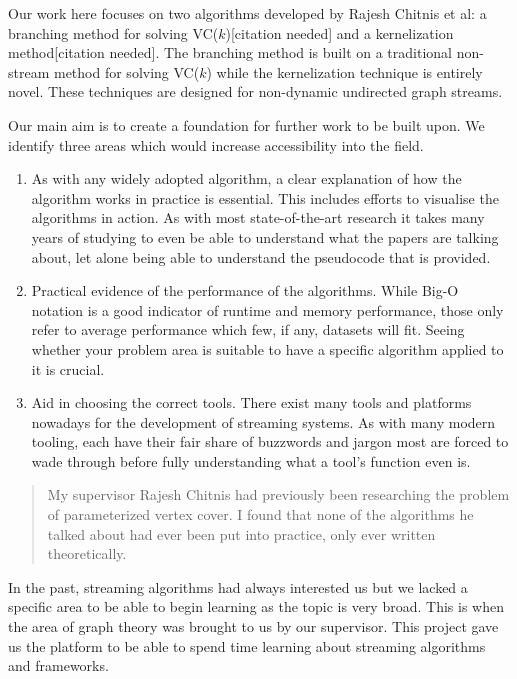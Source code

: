 Our work here focuses on two algorithms developed by Rajesh Chitnis et
al: a branching method for solving VC(\(k\)){[}citation needed{]} and a
kernelization method{[}citation needed{]}. The branching method is built
on a traditional non-stream method for solving VC(\(k\)) while the
kernelization technique is entirely novel. These techniques are designed
for non-dynamic undirected graph streams.

Our main aim is to create a foundation for further work to be built
upon. We identify three areas which would increase accessibility into
the field.

\begin{enumerate}
    \item
          As with any widely adopted algorithm, a clear explanation of how the
          algorithm works in practice is essential. This includes efforts to
          visualise the algorithms in action. As with most state-of-the-art
          research it takes many years of studying to even be able to understand
          what the papers are talking about, let alone being able to understand
          the pseudocode that is provided.
    \item
          Practical evidence of the performance of the algorithms. While Big-O
          notation is a good indicator of runtime and memory performance, those
          only refer to average performance which few, if any, datasets will
          fit. Seeing whether your problem area is suitable to have a specific
          algorithm applied to it is crucial.
    \item
          Aid in choosing the correct tools. There exist many tools and
          platforms nowadays for the development of streaming systems. As with
          many modern tooling, each have their fair share of buzzwords and
          jargon most are forced to wade through before fully understanding what
          a tool's function even is.
\end{enumerate}

\begin{quote}
    My supervisor Rajesh Chitnis had previously been researching the problem
    of parameterized vertex cover. I found that none of the algorithms he
    talked about had ever been put into practice, only ever written
    theoretically.
\end{quote}

In the past, streaming algorithms had always interested us but we lacked
a specific area to be able to begin learning as the topic is very broad.
This is when the area of graph theory was brought to us by our
supervisor. This project gave us the platform to be able to spend time
learning about streaming algorithms and frameworks.